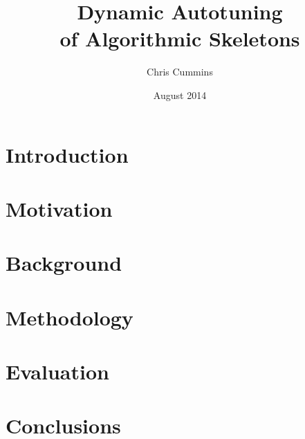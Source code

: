 
\author{Chris Cummins}

\date{August 2014}

\title{Dynamic Autotuning\\of Algorithmic Skeletons}

\newcommand{\subtitle}{MSc by Research Thesis}

\newcommand{\degreeTitle}{MSc by Research\\ Pervasive Parallelism}

\newcommand{\institution}{School of Informatics,\\
  The University of Edinburgh}



\section{Introduction}\label{sec:introduction}


\section{Motivation}\label{sec:motivation}


\section{Background}\label{sec:background}


\section{Methodology}\label{sec:methodology}


\section{Evaluation}\label{sec:evaluation}


\section{Conclusions}\label{sec:conclusions}



